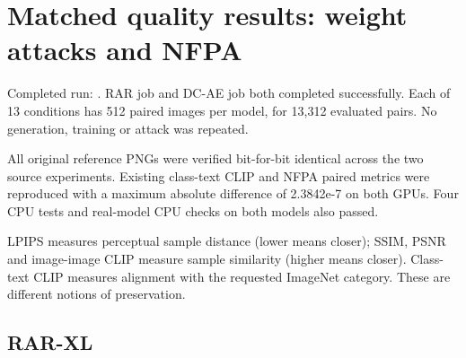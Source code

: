 \section{Matched quality results: weight attacks and
NFPA}\label{record-docs-matched-image-quality-results-md-matched-quality-results-weight-attacks-and-nfpa}

Completed run: \texttt{}. RAR job
\texttt{} and DC-AE job \texttt{}
both completed successfully. Each of 13 conditions has 512 paired images
per model, for 13,312 evaluated pairs. No generation, training or attack
was repeated.

All original reference PNGs were verified bit-for-bit identical across
the two source experiments. Existing class-text CLIP and NFPA paired
metrics were reproduced with a maximum absolute difference of 2.3842e-7
on both GPUs. Four CPU tests and real-model CPU checks on both models
also passed.

LPIPS measures perceptual sample distance (lower means closer); SSIM,
PSNR and image-image CLIP measure sample similarity (higher means
closer). Class-text CLIP measures alignment with the requested ImageNet
category. These are different notions of preservation.

\subsection{RAR-XL}\label{record-docs-matched-image-quality-results-md-rar-xl}

